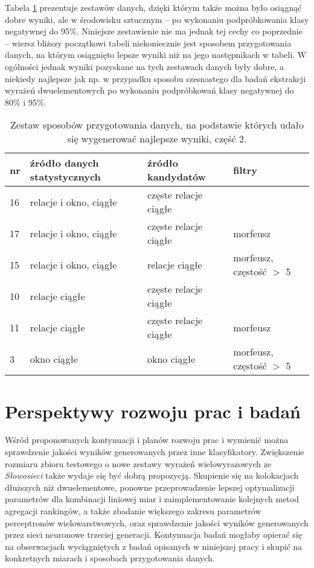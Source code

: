 \par
Tabela \ref{ending_best_data_sets_part_2} prezentuje zestawów danych, dzięki którym także można było osiągnąć dobre wyniki, ale w środowisku sztucznym -- po wykonaniu podpróbkowania klasy negatywnej do 95\%.
Niniejsze zestawienie nie ma jednak tej cechy co poprzednie -- wiersz bliższy początkowi tabeli niekoniecznie jest sposobem przygotowania danych, na którym osiągnięto lepsze wyniki niż na jego następnikach w tabeli.
W ogólności jednak wyniki pozyskane na tych zestawach danych były dobre, a niekiedy najlepsze jak np. w przypadku sposobu szesnastego dla badań ekstrakcji wyrażeń dwuelementowych po wykonaniu podpróbkowań klasy negatywnej do 80\% i 95\%.

\begin{table}[h!]
\centering
\begin{tabular}{ l | l | l | l }
	\toprule
	\textbf{nr} 	& \textbf{źródło danych statystycznych}			& \textbf{źródło kandydatów}		& \textbf{filtry}					\\
	\midrule
	16	& relacje i okno, ciągłe				& częste relacje ciągłe	&							\\
	17	& relacje i okno, ciągłe	 			& częste relacje ciągłe	& morfeusz					\\
	15	& relacje i okno, ciągłe				& relacje ciągłe		& morfeusz, częstość $>$ 5	\\
	10	& relacje ciągłe						& częste relacje ciągłe &							\\
	11	& relacje ciągłe						& częste relacje ciągłe & morfeusz					\\
	3	& okno ciągłe 							& okno ciągłe			& morfeusz, częstość $>$ 5	\\
	\bottomrule
\end{tabular}
\caption[Zestaw sposobów przygotowania danych, na podstawie których udało się wygenerować najlepsze wyniki, część 2]{Zestaw sposobów przygotowania danych, na podstawie których udało się wygenerować najlepsze wyniki, część 2.}
\label{ending_best_data_sets_part_2}
\end{table}

\section{Perspektywy rozwoju prac i badań}
Wśród proponowanych kontynuacji i planów rozwoju prac i wymienić można sprawdzenie jakości wyników generowanych przez inne klasyfikatory.
Zwiększenie rozmiaru zbioru testowego o nowe zestawy wyrażeń wielowyrazowych ze \emph{Słowosieci} także wydaje się być dobrą propozycją.
Skupienie się na kolokacjach dłuższych niż dwuelementowe, ponowne przeprowadzenie lepszej optymalizacji parametrów dla kombinacji liniowej miar i zaimplementowanie kolejnych metod agregacji rankingów, a także zbadanie większego zakresu parametrów perceptronów wielowarstwowych, oraz sprawdzenie jakości wyników generowanych przez sieci neuronowe trzeciej generacji.
Kontynuacja badań mogłaby opierać się na obserwacjach wyciągniętych z badań opisanych w niniejszej pracy i skupić na konkretnych miarach i sposobach przygotowania danych.
